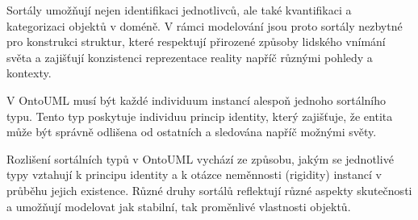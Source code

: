Sortály umožňují nejen identifikaci jednotlivců, ale také kvantifikaci a kategorizaci objektů v doméně. V rámci modelování jsou proto sortály nezbytné pro konstrukci struktur, které respektují přirozené způsoby lidského vnímání světa a zajišťují konzistenci reprezentace reality napříč různými pohledy a kontexty.

V OntoUML musí být každé individuum instancí alespoň jednoho sortálního typu. Tento typ poskytuje individuu princip identity, který zajišťuje, že entita může být správně odlišena od ostatních a sledována napříč možnými světy. \cite{Pergl2018,Rybola2017,KOM_prezentace2}

Rozlišení sortálních typů v OntoUML vychází ze způsobu, jakým se jednotlivé typy vztahují k principu identity a k otázce neměnnosti (rigidity) instancí v průběhu jejich existence. Různé druhy sortálů reflektují různé aspekty skutečnosti a umožňují modelovat jak stabilní, tak proměnlivé vlastnosti objektů.
\vspace{1em}

